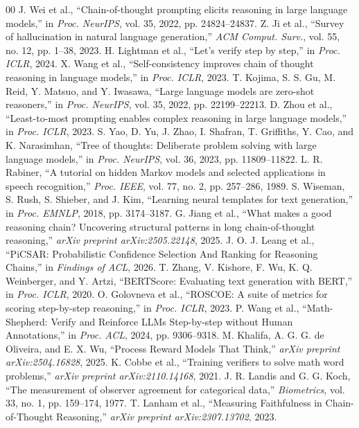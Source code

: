 \documentclass[conference]{IEEEtran}
\begin{document}
\footnotesize
\begin{thebibliography}{00}
\setlength{\itemsep}{0.2pt plus 0.2pt minus 0.2pt}
\setlength{\parskip}{0pt}
 J. Wei et al., ``Chain-of-thought prompting elicits reasoning in large language models,'' in \textit{Proc. NeurIPS}, vol. 35, 2022, pp. 24824--24837.
 Z. Ji et al., ``Survey of hallucination in natural language generation,'' \textit{ACM Comput. Surv.}, vol. 55, no. 12, pp. 1--38, 2023.
 H. Lightman et al., ``Let's verify step by step,'' in \textit{Proc. ICLR}, 2024.
 X. Wang et al., ``Self-consistency improves chain of thought reasoning in language models,'' in \textit{Proc. ICLR}, 2023.
 T. Kojima, S. S. Gu, M. Reid, Y. Matsuo, and Y. Iwasawa, ``Large language models are zero-shot reasoners,'' in \textit{Proc. NeurIPS}, vol. 35, 2022, pp. 22199--22213.
 D. Zhou et al., ``Least-to-most prompting enables complex reasoning in large language models,'' in \textit{Proc. ICLR}, 2023.
 S. Yao, D. Yu, J. Zhao, I. Shafran, T. Griffiths, Y. Cao, and K. Narasimhan, ``Tree of thoughts: Deliberate problem solving with large language models,'' in \textit{Proc. NeurIPS}, vol. 36, 2023, pp. 11809--11822.
 L. R. Rabiner, ``A tutorial on hidden Markov models and selected applications in speech recognition,'' \textit{Proc. IEEE}, vol. 77, no. 2, pp. 257--286, 1989.
 S. Wiseman, S. Rush, S. Shieber, and J. Kim, ``Learning neural templates for text generation,'' in \textit{Proc. EMNLP}, 2018, pp. 3174--3187.
 G. Jiang et al., ``What makes a good reasoning chain? Uncovering structural patterns in long chain-of-thought reasoning,'' \textit{arXiv preprint arXiv:2505.22148}, 2025.
 J. O. J. Leang et al., ``PiCSAR: Probabilistic Confidence Selection And Ranking for Reasoning Chains,'' in \textit{Findings of ACL}, 2026.
 T. Zhang, V. Kishore, F. Wu, K. Q. Weinberger, and Y. Artzi, ``BERTScore: Evaluating text generation with BERT,'' in \textit{Proc. ICLR}, 2020.
 O. Golovneva et al., ``ROSCOE: A suite of metrics for scoring step-by-step reasoning,'' in \textit{Proc. ICLR}, 2023.
 P. Wang et al., ``Math-Shepherd: Verify and Reinforce LLMs Step-by-step without Human Annotations,'' in \textit{Proc. ACL}, 2024, pp. 9306--9318.
 M. Khalifa, A. G. G. de Oliveira, and E. X. Wu, ``Process Reward Models That Think,'' \textit{arXiv preprint arXiv:2504.16828}, 2025.
 K. Cobbe et al., ``Training verifiers to solve math word problems,'' \textit{arXiv preprint arXiv:2110.14168}, 2021.
 J. R. Landis and G. G. Koch, ``The measurement of observer agreement for categorical data,'' \textit{Biometrics}, vol. 33, no. 1, pp. 159--174, 1977.
 T. Lanham et al., ``Measuring Faithfulness in Chain-of-Thought Reasoning,'' \textit{arXiv preprint arXiv:2307.13702}, 2023.
\end{thebibliography}
\end{document}
